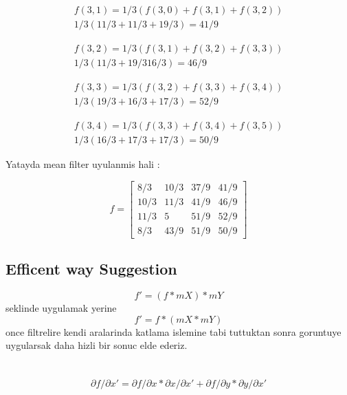 \documentclass[12pt]{article}
\begin{document}
\begin{equation}
\begin{split}
f(3,1) = 1/3 (f(3,0)+f(3,1)+f(3,2)) \\
1/3 (11/3+11/3+19/3) = 41/9
\end{split}
\end{equation}

\begin{equation}
\begin{split}
f(3,2) = 1/3 (f(3,1)+f(3,2)+f(3,3)) \\
1/3 (11/3+19/316/3) = 46/9
\end{split}
\end{equation}

\begin{equation}
\begin{split}
f(3,3) = 1/3 (f(3,2)+f(3,3)+f(3,4)) \\
1/3 (19/3+16/3+17/3) = 52/9
\end{split}
\end{equation}

\begin{equation}
\begin{split}
f(3,4) = 1/3 (f(3,3)+f(3,4)+f(3,5)) \\
1/3 (16/3+17/3+17/3) = 50/9
\end{split}
\end{equation}

Yatayda mean filter uyulanmis hali :

$$f = \begin{bmatrix}
 8/3&  10/3&  37/9&  41/9\\ 
 10/3&  11/3&  41/9&  46/9\\ 
 11/3&  5&  51/9&  52/9\\ 
 8/3&  43/9&  51/9&  50/9
\end{bmatrix}$$

\subsection{ Efficent way Suggestion}

$$ f' =  (f * mX) * mY$$ seklinde uygulamak yerine $$ f' = f * ( mX * mY )$$ once filtrelire kendi aralarinda katlama islemine tabi tuttuktan sonra goruntuye uygularsak daha hizli bir sonuc elde ederiz.


\section{}
$$\partial f / \partial x' = \partial f / \partial x * \partial x / \partial x' + \partial f / \partial y * \partial y / \partial x'$$ 
\end{document}
